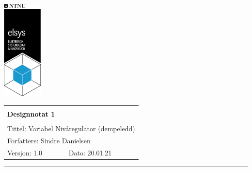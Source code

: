 \documentclass[a4paper,11pt,norsk]{article}
\begin{document}
\begin{minipage}[c]{0.15\textwidth}
\includegraphics[width=2.0cm]{elsys_pos_staaende_ntnu.png}
\end{minipage}
\begin{minipage}[c]{0.85\textwidth}

\renewcommand{\arraystretch}{1.7}
\large 
\begin{tabularx}{\textwidth}{|X|X|}
\hline
\multicolumn{2}{|l|}{} \\
\multicolumn{2}{|l|}{\huge \textbf{Designnotat 1}} \\
\multicolumn{2}{|l|}{}  \\
\hline
\multicolumn{2}{|l|}{Tittel: 
Variabel Nivåregulator (dempeledd)
} \\
\hline
\multicolumn{2}{|l|}{Forfattere: 
Sindre Danielsen
} \\
\hline
Versjon: 1.0 & Dato: 20.01.21
\\
\hline 
\end{tabularx}
\end{minipage}
\normalsize


\setlength{\parskip}{0ex}
\renewcommand{\baselinestretch}{0.1}\normalsize
\tableofcontents
\renewcommand{\baselinestretch}{1.00}\normalsize
\setlength{\parskip}{2ex}
\rule{\textwidth}{1pt}

\newpage
\end{document}
